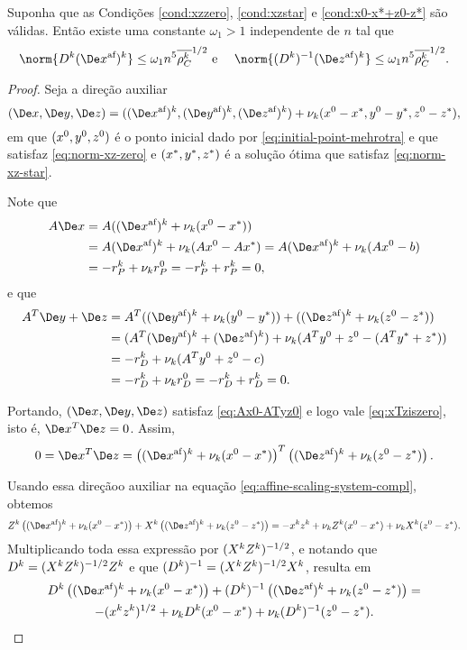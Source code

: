 \begin{lema}\label{lemma:boundDxDzaff}
	Suponha que as Condições \ref{cond:xzzero}, \ref{cond:xzstar} e \ref{cond:x0-x*+z0-z*} são válidas. Então existe uma constante $\omega_1>1$   independente de $n$ tal que 
	\begin{equation}
		\norm{\Dk  \dekx }\leq \omega_1 n^5\dbvec{\rho_C^{k}}^{1/2}\text{ e } \quad  \norm{\Dik  \dekz  }\leq \omega_1 n^5\dbvec{\rho_C^{k}}^{1/2}.
	\end{equation}
\end{lema}
\begin{proof}
	Seja a direção  auxiliar
	\[
		(\Dex,\Dey,\Dez)  = ( \dekx,  \deky  ,  \dekz  ) + \nu_k(\xzero - \xstar,\yzero - \ystar,\zzero - \zstar), 
	\]
em que $(x^0,y^0,z^0)$ é o ponto inicial dado por \eqref{eq:initial-point-mehrotra} e que satisfaz \eqref{eq:norm-xz-zero} e  $(x^*,y^*,z^*)$ é a  solução ótima que satisfaz \eqref{eq:norm-xz-star}.
	
	Note que 
\[
\begin{aligned}
A\Dex & = A( \dekx + \nu_k(\xzero - \xstar)) \\
& =  A\dekx + \nu_k(A\xzero - A\xstar)  =  A\dekx + \nu_k(A\xzero - b)\\
& = -r_{P}^{k}  + \nu_k r_{P}^{0}   = -r_{P}^{k} + r_{P}^{k} = 0,  
\end{aligned}
\]
e que
\[
\begin{aligned}
A^{T}\Dey + \Dez  & = 	A^{T}(\deky + \nu_k(\yzero - \ystar)) + (\dekz + \nu_k(\zzero - \zstar)) \\
							& = 	(A^{T}\deky  + \dekz) + \nu_k(A^{T}\yzero  + \zzero  - (A^{T}\ystar +  \zstar)) \\
							& = 	- r_{D}^{k} + \nu_k(A^{T}\yzero  + \zzero  - c) \\
							& = - r_{D}^{k}  + \nu_k r_{D}^{0}   = -r_{D}^{k} + r_{D}^{k} = 0.   
\end{aligned}
\]


Portando, $(\Dex,\Dey,\Dez)$  satisfaz \eqref{eq:Ax0-ATyz0} e logo vale \eqref{eq:xTziszero}, isto é, $\Dex^{T}\Dez = 0$. Assim, 
	\begin{equation}
		\label{eq:DxDzaff1}
			 0 = \Dex^{T}\Dez = \left( \dekx +  \nu_k(\xzero - \xstar)\right)^{T}\left(  \dekz   +  \nu_k(\zzero - \zstar)\right).
	\end{equation}
	

	 Usando essa direçãoo auxiliar na equação \eqref{eq:affine-scaling-system-compl}, obtemos 
	 \[
	 \Zk\left( \dekx +  \nu_k(\xzero - \xstar)\right)+ \Xk \left(  \dekz   +  \nu_k(\zzero - \zstar)\right) = -\xk\zk + \nu_k \Zk(\xzero - \xstar) + \nu_k \Xk(\zzero - \zstar).
	 \]
	 Multiplicando toda essa expressão por $(X^{k}Z^{k})^{-1/2}$, e notando que $D^{k}=(X^{k}Z^{k})^{-1/2}Z^{k}$ e que $(D^{k})^{-1}=(X^{k}Z^{k})^{-1/2}X^{k}$, resulta em 
	\begin{multline}
		\label{eq:DxDzaff2}
		 \Dk\left( \dekx  +  \nu_k(\xzero - \xstar)\right)+ \Dik \left(  \dekz   +  \nu_k(\zzero - \zstar)\right) = \\ -(\xk\zk)^{1/2} + \nu_k \Dk(\xzero - \xstar) + \nu_k \Dik(\zzero - \zstar).
		\end{multline}
	 

\end{proof}
